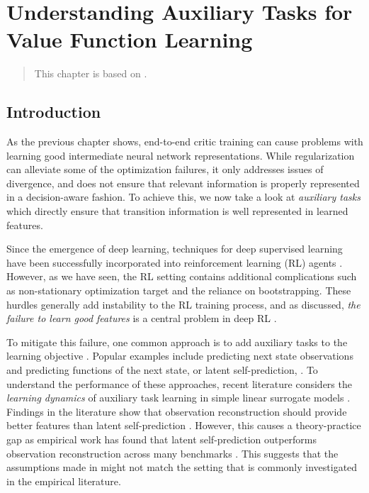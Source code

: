 \chapter{Understanding Auxiliary Tasks for Value Function Learning}
\label{chap:understanding}

\begin{quote}
    This chapter is based on .
\end{quote}

\section{Introduction}

As the previous chapter shows, end-to-end critic training can cause problems with learning good intermediate neural network representations.
While regularization can alleviate some of the optimization failures, it only addresses issues of divergence, and does not ensure that relevant information is properly represented in a decision-aware fashion.
To achieve this, we now take a look at \emph{auxiliary tasks} which directly ensure that transition information is well represented in learned features.

Since the emergence of deep learning, techniques for deep supervised learning have been successfully incorporated into reinforcement learning (RL) agents \parencite{dqn,ddpg}.
However, as we have seen, the RL setting contains additional complications such as non-stationary optimization target and the reliance on bootstrapping.
These hurdles generally add instability to the RL training process, and as discussed, \emph{the failure to learn good features} is a central problem in deep RL \parencite{kumar2021implicit,lyle2022understanding,nikishin2022primacy,hussing2024dissecting}.

To mitigate this failure, one common approach is to add auxiliary tasks to the learning objective \parencite{jaderberg2017reinforcement}. 
Popular examples include predicting next state observations \parencite{jaderberg2016reinforcement} and predicting functions of the next state, or latent self-prediction, \parencite{schwarzer2021dataefficient,ni2024bridging}.
To understand the performance of these approaches, recent literature \parencite{tang2022understanding,lelan2023bootstrapped} considers the \emph{learning dynamics} of auxiliary task learning in simple linear surrogate models \parencite{saxe2014exact}.
Findings in the literature show that observation reconstruction should provide better features than latent self-prediction \parencite{behzadian2019fast,tang2022understanding}. 
However, this causes a theory-practice gap as empirical work has found that latent self-prediction outperforms observation reconstruction across many benchmarks \parencite{schwarzer2021dataefficient,ni2024bridging}.
This suggests that the assumptions made in \textcite{behzadian2019fast,tang2022understanding} might not match the setting that is commonly investigated in the empirical literature.

